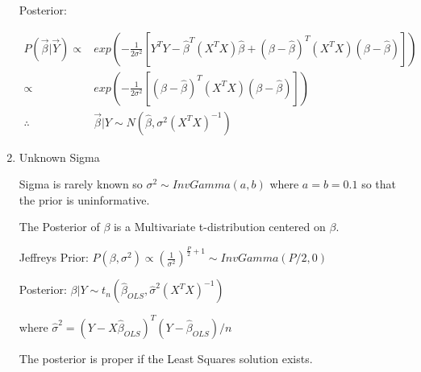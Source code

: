 \documentclass[11pt]{article}
\begin{document}
\begin{enumerate}
Posterior:

\begin{equation}
\begin{split}
P(\vec \beta | \vec Y) \propto & exp \left(- \frac{1}{2 \sigma^2} \left[ Y^T Y - \hat \beta^T (X^T X) \hat \beta + (\beta - \hat \beta)^T (X^T X)(\beta - \hat \beta) \right] \right)\\
\propto & exp \left(- \frac{1}{2 \sigma^2} \left[ (\beta - \hat \beta)^T (X^T X) (\beta - \hat \beta) \right] \right)\\
\therefore & \vec \beta | Y \sim N (\hat \beta, \sigma^2 (X^T X)^{-1})
\end{split}
\end{equation}

\item Unknown Sigma
\label{sec:org3d9662f}

Sigma is rarely known so \(\sigma^2 \sim InvGamma(a, b)\) where \(a = b = 0.1\) so
that the prior is uninformative.

The Posterior of \(\beta\) is a Multivariate t-distribution centered on \(\beta\).

Jeffreys Prior: \(P(\beta, \sigma^2) \propto \left( \frac{1}{\sigma^2} \right)^{\frac{P}{2} + 1} \sim InvGamma(P/2, 0)\)

Posterior: \(\beta | Y \sim t_n (\hat \beta_{OLS}, \hat \sigma^2 (X^T X)^{-1})\)

where \(\hat \sigma^2 = (Y - X \hat \beta_{OLS})^T (Y - \hat \beta_{OLS}) / n\)

The posterior is proper if the Least Squares solution exists.
\end{enumerate}
\end{document}
